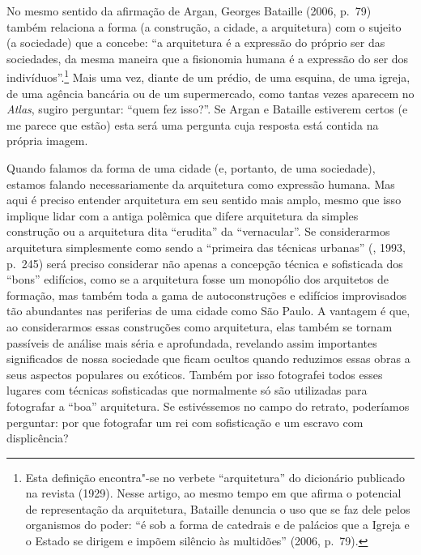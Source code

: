 No mesmo sentido da afirmação de Argan, Georges Bataille (2006, p.~79)
também relaciona a forma (a construção, a cidade, a arquitetura) com o
sujeito (a sociedade) que a concebe: ``a arquitetura é a expressão do
próprio ser das sociedades, da mesma maneira que a fisionomia humana é a
expressão do ser dos indivíduos''.\footnote{Esta definição encontra"-se
  no verbete ``arquitetura'' do dicionário publicado na revista
  {} (1929). Nesse artigo, ao mesmo tempo em que afirma o
  potencial de representação da arquitetura, Bataille denuncia o uso que
  se faz dele pelos organismos do poder: ``é sob a forma de catedrais e
  de palácios que a Igreja e o Estado se dirigem e impõem silêncio às
  multidões'' (2006, p.~79).} Mais uma vez, diante de um prédio, de uma
esquina, de uma igreja, de uma agência bancária ou de um supermercado,
como tantas vezes aparecem no \emph{Atlas}, sugiro perguntar: ``quem fez
isso?''. Se Argan e Bataille estiverem certos (e me parece que estão)
esta será uma pergunta cuja resposta está contida na própria imagem.

Quando falamos da forma de uma cidade (e, portanto, de uma sociedade),
estamos falando necessariamente da arquitetura como expressão humana.
Mas aqui é preciso entender arquitetura em seu sentido mais amplo, mesmo
que isso implique lidar com a antiga polêmica que difere arquitetura da
simples construção ou a arquitetura dita ``erudita'' da ``vernacular''.
Se considerarmos arquitetura simplesmente como sendo a ``primeira das
técnicas urbanas'' (, 1993, p.~245) será preciso considerar não
apenas a concepção técnica e sofisticada dos ``bons'' edifícios, como se
a arquitetura fosse um monopólio dos arquitetos de formação, mas também
toda a gama de autoconstruções e edifícios improvisados tão abundantes
nas periferias de uma cidade como São Paulo. A vantagem é que, ao
considerarmos essas construções como arquitetura, elas também se tornam
passíveis de análise mais séria e aprofundada, revelando assim
importantes significados de nossa sociedade que ficam ocultos quando
reduzimos essas obras a seus aspectos populares ou exóticos. Também por
isso fotografei todos esses lugares com técnicas sofisticadas que
normalmente só são utilizadas para fotografar a ``boa'' arquitetura. Se
estivéssemos no campo do retrato, poderíamos perguntar: por que
fotografar um rei com sofisticação e um escravo com displicência?

